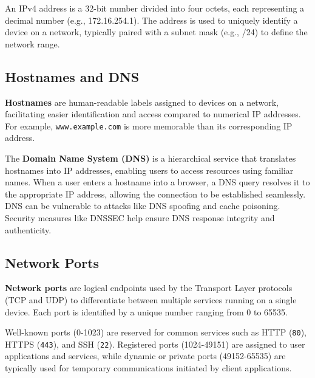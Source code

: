 An IPv4 address is a 32-bit number divided into four octets, each representing a decimal number (e.g., 172.16.254.1). The address is used to uniquely identify a device on a network, typically paired with a subnet mask (e.g., /24) to define the network range.


\subsection{Hostnames and DNS}
\label{hostnames_dns}

\textbf{Hostnames} are human-readable labels assigned to devices on a network, facilitating easier identification and access compared to numerical IP addresses. For example, \texttt{www.example.com} is more memorable than its corresponding IP address.

The \textbf{Domain Name System (DNS)} is a hierarchical service that translates hostnames into IP addresses, enabling users to access resources using familiar names. When a user enters a hostname into a browser, a DNS query resolves it to the appropriate IP address, allowing the connection to be established seamlessly. DNS can be vulnerable to attacks like DNS spoofing and cache poisoning. Security measures like DNSSEC help ensure DNS response integrity and authenticity.

\subsection{Network Ports}
\label{network_ports}

\textbf{Network ports} are logical endpoints used by the Transport Layer protocols (TCP and UDP) to differentiate between multiple services running on a single device. Each port is identified by a unique number ranging from 0 to 65535.

Well-known ports (0-1023) are reserved for common services such as HTTP (\texttt{80}), HTTPS (\texttt{443}), and SSH (\texttt{22}). Registered ports (1024-49151) are assigned to user applications and services, while dynamic or private ports (49152-65535) are typically used for temporary communications initiated by client applications.

